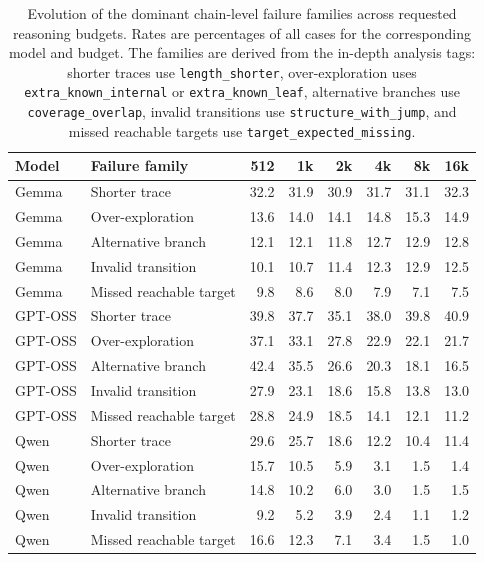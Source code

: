 \begin{table}[t]
    \centering
    \caption{Evolution of the dominant chain-level failure families across requested reasoning budgets. Rates are percentages of all cases for the corresponding model and budget. The families are derived from the in-depth analysis tags: shorter traces use \texttt{length\_shorter}, over-exploration uses \texttt{extra\_known\_internal} or \texttt{extra\_known\_leaf}, alternative branches use \texttt{coverage\_overlap}, invalid transitions use \texttt{structure\_with\_jump}, and missed reachable targets use \texttt{target\_expected\_missing}.}
    \label{tab:failure-budget-evolution}
    \scriptsize
    \begin{tabular}{llrrrrrr}
        \toprule
        Model & Failure family & 512 & 1k & 2k & 4k & 8k & 16k \\
        \midrule
        Gemma & Shorter trace & 32.2 & 31.9 & 30.9 & 31.7 & 31.1 & 32.3 \\
        Gemma & Over-exploration & 13.6 & 14.0 & 14.1 & 14.8 & 15.3 & 14.9 \\
        Gemma & Alternative branch & 12.1 & 12.1 & 11.8 & 12.7 & 12.9 & 12.8 \\
        Gemma & Invalid transition & 10.1 & 10.7 & 11.4 & 12.3 & 12.9 & 12.5 \\
        Gemma & Missed reachable target & 9.8 & 8.6 & 8.0 & 7.9 & 7.1 & 7.5 \\
        \midrule
        GPT-OSS & Shorter trace & 39.8 & 37.7 & 35.1 & 38.0 & 39.8 & 40.9 \\
        GPT-OSS & Over-exploration & 37.1 & 33.1 & 27.8 & 22.9 & 22.1 & 21.7 \\
        GPT-OSS & Alternative branch & 42.4 & 35.5 & 26.6 & 20.3 & 18.1 & 16.5 \\
        GPT-OSS & Invalid transition & 27.9 & 23.1 & 18.6 & 15.8 & 13.8 & 13.0 \\
        GPT-OSS & Missed reachable target & 28.8 & 24.9 & 18.5 & 14.1 & 12.1 & 11.2 \\
        \midrule
        Qwen & Shorter trace & 29.6 & 25.7 & 18.6 & 12.2 & 10.4 & 11.4 \\
        Qwen & Over-exploration & 15.7 & 10.5 & 5.9 & 3.1 & 1.5 & 1.4 \\
        Qwen & Alternative branch & 14.8 & 10.2 & 6.0 & 3.0 & 1.5 & 1.5 \\
        Qwen & Invalid transition & 9.2 & 5.2 & 3.9 & 2.4 & 1.1 & 1.2 \\
        Qwen & Missed reachable target & 16.6 & 12.3 & 7.1 & 3.4 & 1.5 & 1.0 \\
        \bottomrule
    \end{tabular}
\end{table}
